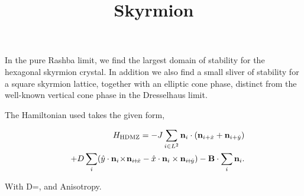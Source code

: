 \documentclass[reprint,amsmath,amssymb,aps,showpacs,superscriptaddress,prl]{revtex4-1}
\newcommand{\ba}{\begin{eqnarray}}
\newcommand{\ea}{\end{eqnarray}}
\renewcommand{\v}[1]{{\bf #1}}
\newcommand{\nn}{\nonumber \\}
\begin{document}
%
\title{Skyrmion}

\maketitle

In the pure Rashba limit, we find the largest domain of stability for the hexagonal skyrmion crystal. In addition we also find a small sliver of stability for a square skyrmion lattice, together with an elliptic cone phase, distinct from the well-known vertical cone phase in the Dresselhaus limit. 

The Hamiltonian used takes the given form,

\ba && H_{\rm HDMZ} = -J \sum_{i\in L^2} \v n_i \cdot (\v n_{i+\hat{x}} + \v n_{i+\hat{y}} ) \nn
 & & + D \sum_i ( \hat{y} \cdot \v n_i \! \times \! \v n_{i\! +\! \hat{x}} - \hat{x} \cdot \v n_i \times \v n_{i\! +\! \hat{y}} )  - \v B \cdot \sum_i \v n_i .  \label{eq:HDMZ} \ea
%

With D=, and Anisotropy.
 
\end{document}
